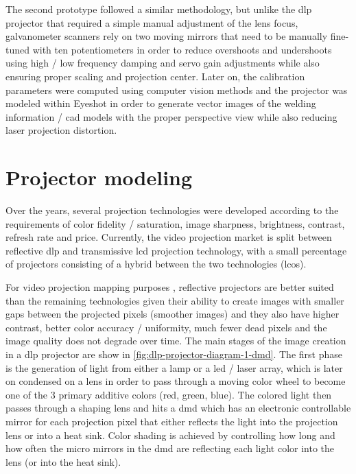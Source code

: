 The second prototype followed a similar methodology, but unlike the \gls{dlp} projector that required a simple manual adjustment of the lens focus, galvanometer scanners rely on two moving mirrors that need to be manually fine-tuned with ten potentiometers in order to reduce overshoots and undershoots using high / low frequency damping and servo gain adjustments while also ensuring proper scaling and projection center. Later on, the calibration parameters were computed using computer vision methods and the projector was modeled within Eyeshot in order to generate vector images of the welding information / \gls{cad} models with the proper perspective view while also reducing laser projection distortion.


\section{Projector modeling}

Over the years, several projection technologies were developed according to the requirements of color fidelity / saturation, image sharpness, brightness, contrast, refresh rate and price. Currently, the video projection market is split between reflective \gls{dlp} and transmissive \gls{lcd} projection technology, with a small percentage of projectors consisting of a hybrid between the two technologies (\gls{lcos}).

For video projection mapping purposes \cite{Raskar1998,Bimber2005,Tan2013,Fujimoto2014}, reflective projectors are better suited than the remaining technologies given their ability to create images with smaller gaps between the projected pixels (smoother images) and they also have higher contrast, better color accuracy / uniformity, much fewer dead pixels and the image quality does not degrade over time. The main stages of the image creation in a \gls{dlp} projector are show in \cref{fig:dlp-projector-diagram-1-dmd}. The first phase is the generation of light from either a lamp or a \gls{led} / laser array, which is later on condensed on a lens in order to pass through a moving color wheel to become one of the 3 primary additive colors (red, green, blue). The colored light then passes through a shaping lens and hits a \gls{dmd} which has an electronic controllable mirror for each projection pixel that either reflects the light into the projection lens or into a heat sink. Color shading is achieved by controlling how long and how often the micro mirrors in the \gls{dmd} are reflecting each light color into the lens (or into the heat sink).

